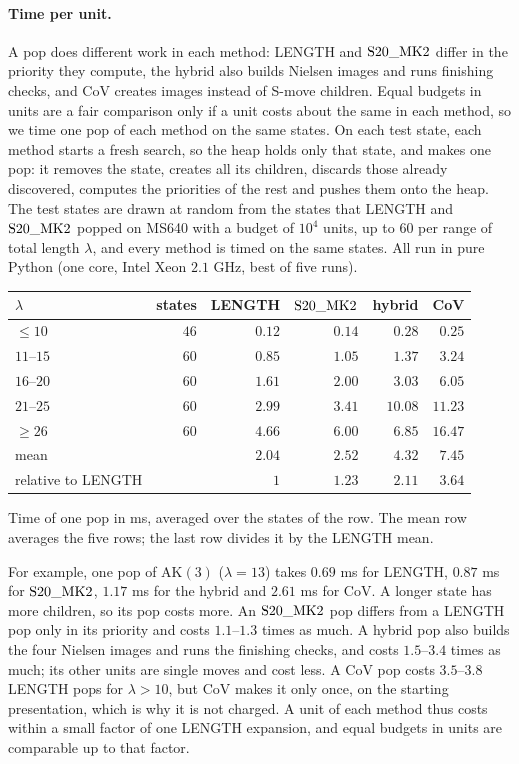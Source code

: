 \paragraph{Time per unit.} A pop does different work in each method: LENGTH and $\mathrm{S20\_MK2}$ differ in the priority they
compute, the hybrid also builds Nielsen images and runs finishing checks, and CoV creates images instead of S-move
children. Equal budgets in units are a fair comparison only if a unit costs about the same in each method, so we time
one pop of each method on the same states. On each test state, each method starts a fresh search, so the heap holds
only that state, and makes one pop: it removes the state, creates all its children, discards those already discovered,
computes the priorities of the rest and pushes them onto the heap. The test states are drawn at random from the states
that LENGTH and $\mathrm{S20\_MK2}$ popped on MS640 with a budget of $10^4$ units, up to $60$ per range of total length $\lambda$,
and every method is timed on the same states. All run in pure Python (one core, Intel Xeon $2.1$ GHz, best of five
runs).
\begin{center}
\small
\begin{tabular}{lrrrrr}
\toprule
$\lambda$ & states & LENGTH & $\mathrm{S20\_MK2}$ & hybrid & CoV\\
\midrule
$\le10$ & $46$ & $0.12$ & $0.14$ & $0.28$ & $0.25$\\
$11$--$15$ & $60$ & $0.85$ & $1.05$ & $1.37$ & $3.24$\\
$16$--$20$ & $60$ & $1.61$ & $2.00$ & $3.03$ & $6.05$\\
$21$--$25$ & $60$ & $2.99$ & $3.41$ & $10.08$ & $11.23$\\
$\ge26$ & $60$ & $4.66$ & $6.00$ & $6.85$ & $16.47$\\
\midrule
mean & & $2.04$ & $2.52$ & $4.32$ & $7.45$\\
relative to LENGTH & & $1$ & $1.23$ & $2.11$ & $3.64$\\
\bottomrule
\end{tabular}

\smallskip
\footnotesize Time of one pop in ms, averaged over the states of the row. The mean row averages the five rows; the last row divides it by the LENGTH mean.
\end{center}
For example, one pop of $\mathrm{AK}(3)$ ($\lambda=13$) takes $0.69$ ms for LENGTH, $0.87$ ms for $\mathrm{S20\_MK2}$, $1.17$ ms
for the hybrid and $2.61$ ms for CoV. A longer state has more children, so its pop costs more. An $\mathrm{S20\_MK2}$ pop differs
from a LENGTH pop only in its priority and costs $1.1$--$1.3$ times as much. A hybrid pop also builds the four Nielsen
images and runs the finishing checks, and costs $1.5$--$3.4$ times as much; its other units are single moves and cost
less. A CoV pop costs $3.5$--$3.8$ LENGTH pops for $\lambda>10$, but CoV makes it only once, on the starting
presentation, which is why it is not charged. A unit of each method thus costs within a small factor of one LENGTH
expansion, and equal budgets in units are comparable up to that factor.

